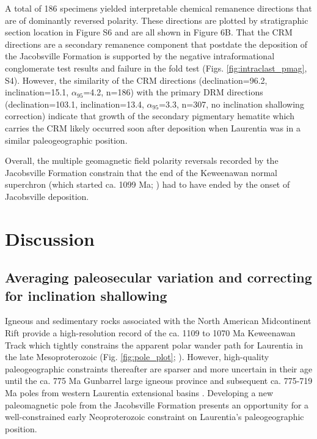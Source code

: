 A total of 186 specimens yielded interpretable chemical remanence directions that are of dominantly reversed polarity. These directions are plotted by stratigraphic section location in Figure S6 and are all shown in Figure 6B. That the CRM directions are a secondary remanence component that postdate the deposition of the Jacobsville Formation is supported by the negative intraformational conglomerate test results and failure in the fold test (Figs. \ref{fig:intraclast_pmag}, S4). However, the similarity of the CRM directions (declination=96.2\textdegree, inclination=15.1\textdegree, $\alpha_{95}$=4.2\textdegree, n=186) with the primary DRM directions (declination=103.1\textdegree, inclination=13.4\textdegree, $\alpha_{95}$=3.3\textdegree, n=307, no inclination shallowing correction) indicate that growth of the secondary pigmentary hematite which carries the CRM likely occurred soon after deposition when Laurentia was in a similar paleogeographic position. 

Overall, the multiple geomagnetic field polarity reversals recorded by the Jacobsville Formation constrain that the end of the Keweenawan normal superchron \cite{Driscoll2016b} (which started ca. 1099 Ma; ) had to have ended by the onset of Jacobsville deposition.
 
\section*{Discussion}
\subsection*{Averaging paleosecular variation and correcting for inclination shallowing}

Igneous and sedimentary rocks associated with the North American Midcontinent Rift provide a high-resolution record of the ca. 1109 to 1070 Ma Keweenawan Track which tightly constrains the apparent polar wander path for Laurentia in the late Mesoproterozoic (Fig. \ref{fig:pole_plot}; ). However, high-quality paleogeographic constraints thereafter are sparser and more uncertain in their age until the ca. 775 Ma Gunbarrel large igneous province \cite{Harlan2003a} and subsequent ca. 775-719 Ma poles from western Laurentia extensional basins \cite{Weil2006a, Eyster2019a}. Developing a new paleomagnetic pole from the Jacobsville Formation presents an opportunity for a well-constrained early Neoproterozoic constraint on Laurentia's paleogeographic position. 

